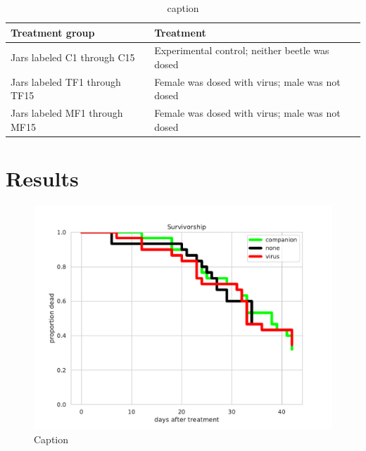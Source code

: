 \documentclass[11pt,letterpaper]{scrartcl}
\begin{document}
\begin{table}[h]
	\centering
\caption{caption}
	
\begin{tabular}{ll}
	\toprule
	Treatment group & Treatment\\
	\midrule
	Jars labeled C1 through C15 & Experimental control; neither beetle was dosed\\
    Jars labeled TF1 through TF15 & Female was dosed with virus; male was not dosed\\
    Jars labeled MF1 through MF15 & Female was dosed with virus; male was not dosed\\
	\bottomrule
\end{tabular} 

\end{table}

\section{Results}

\begin{figure}[h]
\centering
\includegraphics[width=\textwidth]{survivorship.pdf}
\caption{Caption}
\label{fig:survivorship}
\end{figure}
\end{document}
